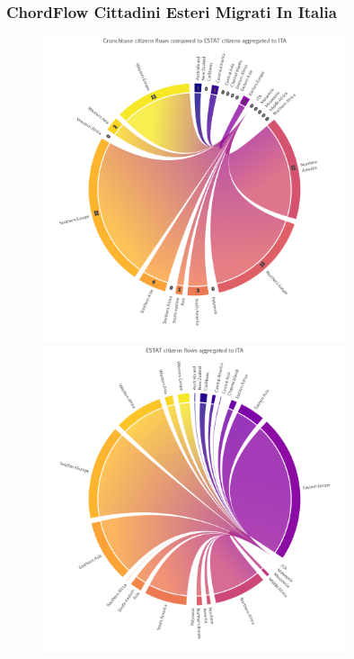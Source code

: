 
\subsubsection{ChordFlow Cittadini Esteri Migrati In Italia}
\begin{figure}[t]
    \centering
    \includegraphics[width=0.8\textwidth]{images/ChordFlows/filtered_destination/ita/Crunchbase_cit_ESTAT_True.png}
    \includegraphics[width=0.8\textwidth]{images/ChordFlows/filtered_destination/ita/ESTAT_cit_True.png}
    \label{fig:chordtoita_nat_true}
\end{figure}

